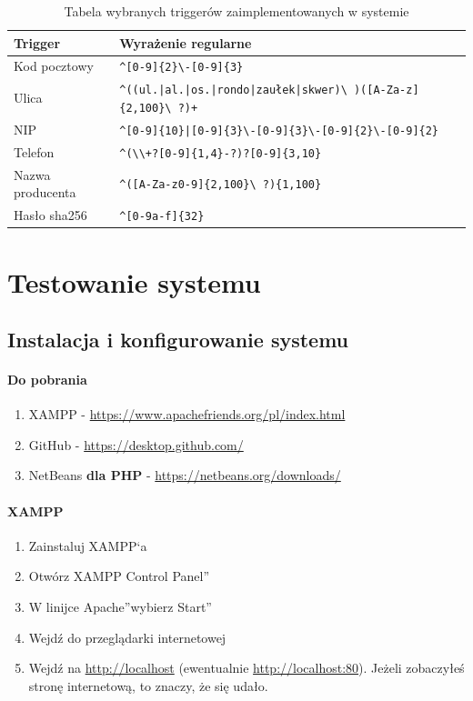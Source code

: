 \documentclass[a4paper, 12pt]{article}
\begin{document}
\begin{table}[H]
	\caption[Tabela wybranych triggerów]{Tabela wybranych triggerów zaimplementowanych w systemie}
	\label{tab:tabelaTrigerów}
		\hskip-1cm\begin{tabular}{ l l }
			Trigger & Wyrażenie regularne \\ \hline
			Kod pocztowy & \verb=^[0-9]{2}\-[0-9]{3}= \\ \hline
			Ulica & \verb=^((ul.|al.|os.|rondo|zaułek|skwer)\ )([A-Za-z]{2,100}\ ?)+= \\ \hline
			NIP & \verb=^[0-9]{10}|[0-9]{3}\-[0-9]{3}\-[0-9]{2}\-[0-9]{2}= \\ \hline
			Telefon & \verb=^(\\+?[0-9]{1,4}-?)?[0-9]{3,10}= \\ \hline
			Nazwa producenta & \verb=^([A-Za-z0-9]{2,100}\ ?){1,100}= \\ \hline
			Hasło sha256 & \verb=^[0-9a-f]{32}= \\ \hline
		\end{tabular}
\end{table}

\cleardoublepage
\section{Testowanie systemu}
\subsection{Instalacja i konfigurowanie systemu}
\paragraph{Do pobrania}
\begin{enumerate}
	\item XAMPP - \url{https://www.apachefriends.org/pl/index.html}
	\item GitHub - \url{https://desktop.github.com/}
	\item NetBeans \textbf{dla PHP} - {\url{https://netbeans.org/downloads/}}
\end{enumerate}
\paragraph{XAMPP}
\begin{enumerate}
	\item Zainstaluj XAMPP`a
	\item Otwórz \quotedblbase XAMPP Control Panel\textquotedblright
	\item W linijce \quotedblbase Apache\textquotedblright wybierz \quotedblbase Start\textquotedblright
	\item Wejdź do przeglądarki internetowej
	\item Wejdź na \url{http://localhost} (ewentualnie \url{http://localhost:80}). Jeżeli zobaczyłeś stronę internetową, to znaczy, że się udało.
\end{enumerate}
\end{document}
